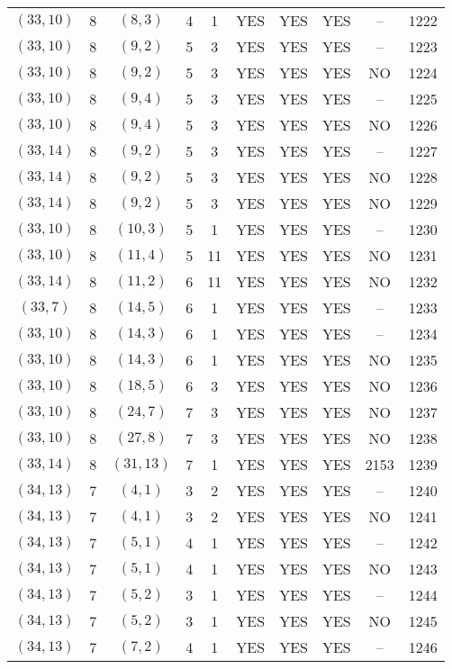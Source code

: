 \begin{longtable}{|c|c|c|c|c|c|c|c|c|c|}
$(33, 10)$ & 8 & $(8, 3)$ & 4 & 1 & YES & YES & YES & -- & 1222\\
$(33, 10)$ & 8 & $(9, 2)$ & 5 & 3 & YES & YES & YES & -- & 1223\\
$(33, 10)$ & 8 & $(9, 2)$ & 5 & 3 & YES & YES & YES & NO & 1224\\
$(33, 10)$ & 8 & $(9, 4)$ & 5 & 3 & YES & YES & YES & -- & 1225\\
$(33, 10)$ & 8 & $(9, 4)$ & 5 & 3 & YES & YES & YES & NO & 1226\\
$(33, 14)$ & 8 & $(9, 2)$ & 5 & 3 & YES & YES & YES & -- & 1227\\
$(33, 14)$ & 8 & $(9, 2)$ & 5 & 3 & YES & YES & YES & NO & 1228\\
$(33, 14)$ & 8 & $(9, 2)$ & 5 & 3 & YES & YES & YES & NO & 1229\\
$(33, 10)$ & 8 & $(10, 3)$ & 5 & 1 & YES & YES & YES & -- & 1230\\
$(33, 10)$ & 8 & $(11, 4)$ & 5 & 11 & YES & YES & YES & NO & 1231\\
$(33, 14)$ & 8 & $(11, 2)$ & 6 & 11 & YES & YES & YES & NO & 1232\\
$(33, 7)$ & 8 & $(14, 5)$ & 6 & 1 & YES & YES & YES & -- & 1233\\
$(33, 10)$ & 8 & $(14, 3)$ & 6 & 1 & YES & YES & YES & -- & 1234\\
$(33, 10)$ & 8 & $(14, 3)$ & 6 & 1 & YES & YES & YES & NO & 1235\\
$(33, 10)$ & 8 & $(18, 5)$ & 6 & 3 & YES & YES & YES & NO & 1236\\
$(33, 10)$ & 8 & $(24, 7)$ & 7 & 3 & YES & YES & YES & NO & 1237\\
$(33, 10)$ & 8 & $(27, 8)$ & 7 & 3 & YES & YES & YES & NO & 1238\\
$(33, 14)$ & 8 & $(31, 13)$ & 7 & 1 & YES & YES & YES & 2153 & 1239\\
$(34, 13)$ & 7 & $(4, 1)$ & 3 & 2 & YES & YES & YES & -- & 1240\\
$(34, 13)$ & 7 & $(4, 1)$ & 3 & 2 & YES & YES & YES & NO & 1241\\
$(34, 13)$ & 7 & $(5, 1)$ & 4 & 1 & YES & YES & YES & -- & 1242\\
$(34, 13)$ & 7 & $(5, 1)$ & 4 & 1 & YES & YES & YES & NO & 1243\\
$(34, 13)$ & 7 & $(5, 2)$ & 3 & 1 & YES & YES & YES & -- & 1244\\
$(34, 13)$ & 7 & $(5, 2)$ & 3 & 1 & YES & YES & YES & NO & 1245\\
$(34, 13)$ & 7 & $(7, 2)$ & 4 & 1 & YES & YES & YES & -- & 1246\\

\end{longtable}
